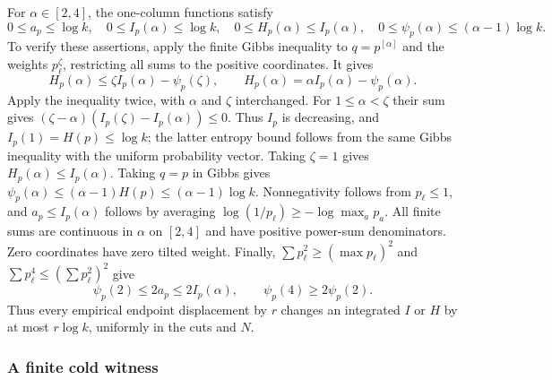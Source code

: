 For $\alpha\in[2,4]$, the one-column functions satisfy
\begin{equation}\label{eq:repair-global-one-column-bounds}
 0\le a_p\le\log k,\quad
 0\le I_p(\alpha)\le\log k,\quad
 0\le H_p(\alpha)\le I_p(\alpha),\quad
 0\le\psi_p(\alpha)\le(\alpha-1)\log k.
\end{equation}
To verify these assertions, apply the finite Gibbs inequality to
$q=p^{[\alpha]}$ and the weights $p_\ell^\zeta$, restricting all sums to
the positive coordinates. It gives
\[
 H_p(\alpha)\le\zeta I_p(\alpha)-\psi_p(\zeta),\qquad
 H_p(\alpha)=\alpha I_p(\alpha)-\psi_p(\alpha).
\]
Apply the inequality twice, with $\alpha$ and $\zeta$ interchanged. For
$1\le\alpha<\zeta$ their sum gives
$(\zeta-\alpha)(I_p(\zeta)-I_p(\alpha))\le0$.
Thus $I_p$ is decreasing, and $I_p(1)=H(p)\le\log k$; the latter
entropy bound follows from the same Gibbs inequality with the uniform
probability vector. Taking $\zeta=1$ gives $H_p(\alpha)\le I_p(\alpha)$.
Taking $q=p$ in Gibbs gives
$\psi_p(\alpha)\le(\alpha-1)H(p)\le(\alpha-1)\log k$.
Nonnegativity follows from $p_\ell\le1$, and $a_p\le I_p(\alpha)$
follows by averaging $\log(1/p_\ell)\ge-\log\max_a p_a$.
All finite sums are continuous in $\alpha$ on $[2,4]$ and have positive
power-sum denominators. Zero coordinates have zero tilted weight.
Finally, $\sum p_\ell^2\ge(\max p_\ell)^2$ and
$\sum p_\ell^4\le(\sum p_\ell^2)^2$ give
\begin{equation}\label{eq:repair-two-comparisons}
 \psi_p(2)\le2a_p\le2I_p(\alpha),\qquad
 \psi_p(4)\ge2\psi_p(2).
\end{equation}Thus every empirical endpoint displacement by $r$ changes an integrated
$I$ or $H$ by at most $r\log k$, uniformly in the cuts and $N$.


\subsubsection{A finite cold witness}

